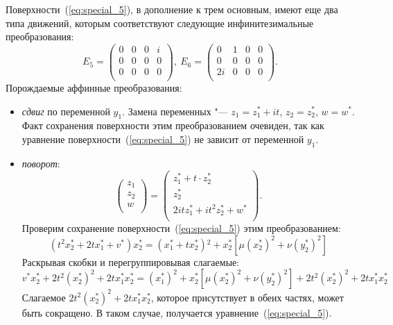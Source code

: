 \documentclass[../main.tex]{subfiles}
\begin{document}
Поверхности~(\ref{eq:special_5}), в дополнение к трем основным, имеют еще два типа движений, которым соответствуют следующие инфинитезимальные преобразования:
\begin{equation*}
E_5 = \left(
\begin{array}{cccc}
 0 & 0 & 0 & i \\
 0 & 0 & 0 & 0 \\
 0 & 0 & 0 & 0 \\
\end{array}
\right),~
E_6 = \left(
\begin{array}{cccc}
 0 & 1 & 0 & 0 \\
 0 & 0 & 0 & 0 \\
 2i & 0 & 0 & 0 \\
\end{array}
\right).
\end{equation*}
Порождаемые аффинные преобразования:
\begin{itemize}
\item \textit{сдвиг} по переменной $y_1$. Замена переменных "--- $z_1 = z_1^* + i t$, $z_2 = z_2^*$, $w = w^*$. Факт сохранения поверхности этим преобразованием очевиден, так как уравнение поверхности~(\ref{eq:special_5}) не зависит от переменной $y_1$.

\item \textit{поворот}:
\begin{equation*}
\left(
\begin{array}{c}
 z_1 \\
 z_2 \\
 w \\
\end{array}
\right) =
\left(
\begin{array}{c}
 z_1^* + t \cdot z_2^* \\
 z_2^*\\
 2 i t z_1^* + i t^2 z_2^* + w^*\\
\end{array}
\right).
\end{equation*}
Проверим сохранение поверхности~(\ref{eq:special_5}) этим преобразованием:
\begin{equation*}
\left(t^2 x_2^* +2 t x_1^* + v^*\right) x_2^* = \left(x_1^* + t x_2^*\right){}^2 + x_2^* \left[\mu  (x_2^*)^2+\nu  (y_2^*)^2\right]
\end{equation*}
Раскрывая скобки и перегруппировывая слагаемые:
\begin{equation*}
v^* x_2^* + 2 t^2 (x_2^*)^2 + 2 t x_1^* x_2^* = (x_1^*)^2 + x_2^* \left[\mu  (x_2^*)^2+\nu  (y_2^*)^2\right]+ 2t^2 (x_2^*)^2 + 2 t x_1^* x_2^*
\end{equation*}
Слагаемое $2t^2 (x_2^*)^2 + 2 t x_1^* x_2^*$, которое присутствует в обеих частях, может быть сокращено. В таком случае, получается уравнение~(\ref{eq:special_5}).
\end{itemize}
\end{document}
